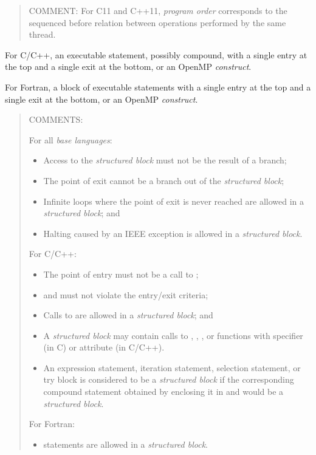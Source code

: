 \begin{quote}
COMMENT: For C11 and C++11, \emph{program order} corresponds to the sequenced
before relation between operations performed by the same thread.
\end{quote}
\glossarydefend

\glossarydefstart
For C/C++, an executable statement, possibly compound, with a single entry at the
top and a single exit at the bottom, or an OpenMP \emph{construct}.

For Fortran, a block of executable statements with a single entry at the top and a
single exit at the bottom, or an OpenMP \emph{construct}.

\begin{quote}
COMMENTS:

For all \emph{base languages}:

\begin{itemize}
\item Access to the \emph{structured block} must not be the result of a branch;

\item The point of exit cannot be a branch out of the \emph{structured block};

\item Infinite loops where the point of exit is never reached are
allowed in a \emph{structured block}; and

\item Halting caused by an IEEE exception is allowed in a \emph{structured block}.
\end{itemize}

For C/C++:

\begin{itemize}
\item The point of entry must not be a call to ;

\item {} and  must not violate the entry/exit criteria;

\item Calls to  are allowed in a \emph{structured block}; and

\item A \emph{structured block} may contain calls to ,
, ,  or functions
with  specifier (in C) or  attribute (in C/C++).
  
\item An expression statement, iteration statement, selection statement,
or try block is considered to be a \emph{structured block} if the
corresponding compound statement obtained by enclosing it in \tcode{\{}
and \tcode{\}} would be a \emph{structured block}.
\end{itemize}

For Fortran:

\begin{itemize}
\item {} statements are allowed in a \emph{structured block}.
\end{itemize}
\end{quote}
\glossarydefend

